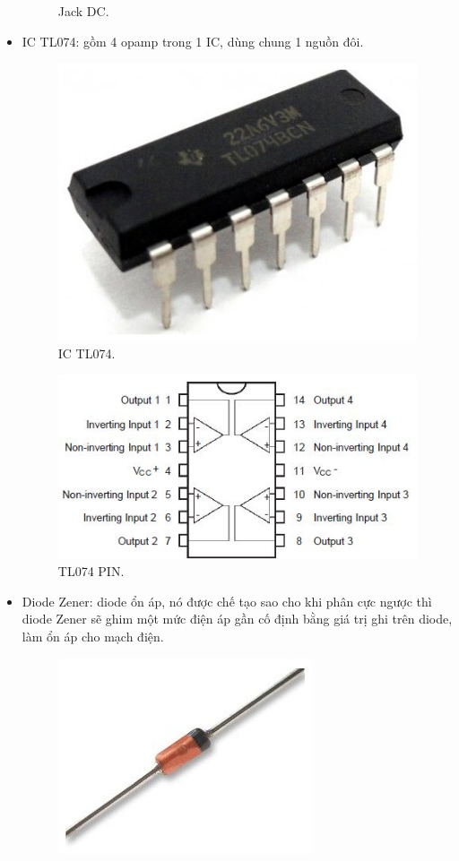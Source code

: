 \documentclass[a4paper,12pt,oneside]{article}
\begin{document}
\begin{itemize}
\begin{figure}[H]
\begin{center}
\end{center}
\caption{Jack DC.}
\end{figure}
\item	IC TL074: gồm 4 opamp trong 1 IC, dùng chung 1 nguồn đôi.
\begin{figure}[H]
\centering
\begin{center}
\includegraphics[scale=.3]{hinh/PPM/ppm_tl074.jpg}
\end{center}
\caption{IC TL074.}
\end{figure}
\begin{figure}[H]
\centering
\begin{center}
\includegraphics[scale=1]{hinh/PPM/ppm_tl074_pin.jpg}
\end{center}
\caption{TL074 PIN.}
\end{figure}
\item	Diode Zener: diode ổn áp, nó được chế tạo sao cho khi phân cực ngược thì diode Zener sẽ ghim một mức điện áp gần cố định bằng giá trị ghi trên diode, làm ổn áp cho mạch điện.
\begin{figure}[H]
\centering
\begin{center}
\includegraphics[scale=.5]{hinh/PPM/ppm_zener.jpg}

\end{center}
\end{figure}
\end{itemize}
\end{document}
